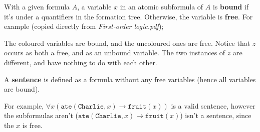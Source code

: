 \documentclass[a4paper, 12pt]{article}
\begin{document}
                With a given formula $A$, a variable $x$ in an atomic subformula of $A$ is \textbf{bound} if it's under a quantifiers in the formation tree. Otherwise, the variable is \textbf{free}. For example (copied directly from \textit{First-order logic.pdf});
                \begin{center}
                \end{center}
                The coloured variables are bound, and the uncoloured ones are free. Notice that $z$ occurs as both a free, and as an unbound variable. The two instances of $z$ are different, and have nothing to do with each other.
                \medskip

                A \textbf{sentence} is defined as a formula without any free variables (hence all variables are bound).
                \medskip

                For example, $\forall x (\texttt{ate}(\texttt{Charlie}, x) \rightarrow \texttt{fruit}(x))$ is a valid sentence, however the subformulas aren't ($\texttt{ate}(\texttt{Charlie}, x) \rightarrow \texttt{fruit}(x)$) isn't a sentence, since the $x$ is free.
                \medskip
\end{document}
